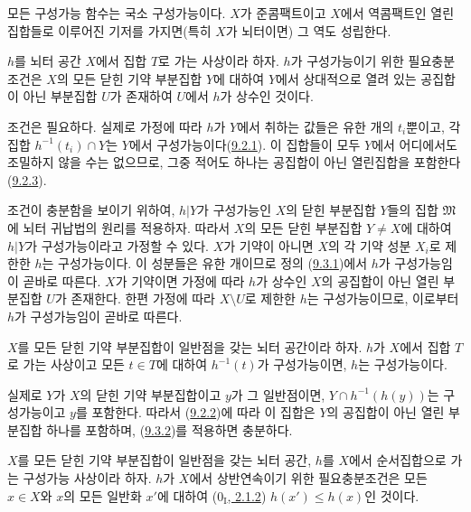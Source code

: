 모든 구성가능 함수는 국소 구성가능이다. $X$가 준콤팩트이고 $X$에서
역콤팩트인 열린집합들로 이루어진 기저를 가지면(특히 $X$가 뇌터이면)
그 역도 성립한다.

\begin{proposition}[9.3.2]
\label{0.9.3.2-ko}
$h$를 뇌터 공간 $X$에서 집합 $T$로 가는 사상이라 하자. $h$가
구성가능이기 위한 필요충분조건은 $X$의 모든 닫힌 기약 부분집합 $Y$에
대하여 $Y$에서 상대적으로 열려 있는 공집합이 아닌 부분집합 $U$가
존재하여 $U$에서 $h$가 상수인 것이다.
\end{proposition}

조건은 필요하다. 실제로 가정에 따라 $h$가 $Y$에서 취하는 값들은
유한 개의 $t_i$뿐이고, 각 집합 $h^{-1}(t_i)\cap Y$는 $Y$에서
구성가능이다(\hyperref[0.9.2.1-ko]{9.2.1}). 이 집합들이 모두 $Y$에서
어디에서도 조밀하지 않을 수는 없으므로, 그중 적어도 하나는 공집합이
아닌 열린집합을 포함한다
(\hyperref[0.9.2.3-ko]{9.2.3}).

조건이 충분함을 보이기 위하여, $h|Y$가 구성가능인 $X$의 닫힌 부분집합
$Y$들의 집합 $\mathfrak{M}$에 뇌터 귀납법의 원리를 적용하자. 따라서
$X$의 모든 닫힌 부분집합 $Y\ne X$에 대하여 $h|Y$가 구성가능이라고
가정할 수 있다. $X$가 기약이 아니면 $X$의 각 기약 성분 $X_i$로 제한한
$h$는 구성가능이다. 이 성분들은 유한 개이므로 정의
(\hyperref[0.9.3.1-ko]{9.3.1})에서 $h$가 구성가능임이 곧바로 따른다.
$X$가 기약이면 가정에 따라 $h$가 상수인 $X$의 공집합이 아닌 열린
부분집합 $U$가 존재한다. 한편 가정에 따라 $X\setminus U$로 제한한
$h$는 구성가능이므로, 이로부터 $h$가 구성가능임이 곧바로 따른다.

\begin{corollary}[9.3.3]
\label{0.9.3.3-ko}
$X$를 모든 닫힌 기약 부분집합이 일반점을 갖는 뇌터 공간이라 하자.
$h$가 $X$에서 집합 $T$로 가는 사상이고 모든 $t\in T$에 대하여
$h^{-1}(t)$가 구성가능이면, $h$는 구성가능이다.
\end{corollary}

실제로 $Y$가 $X$의 닫힌 기약 부분집합이고 $y$가 그 일반점이면,
$Y\cap h^{-1}(h(y))$는 구성가능이고 $y$를 포함한다. 따라서
(\hyperref[0.9.2.2-ko]{9.2.2})에 따라 이 집합은 $Y$의 공집합이 아닌
열린 부분집합 하나를 포함하며,
(\hyperref[0.9.3.2-ko]{9.3.2})를 적용하면 충분하다.

\begin{proposition}[9.3.4]
\label{0.9.3.4-ko}
$X$를 모든 닫힌 기약 부분집합이 일반점을 갖는 뇌터 공간, $h$를
$X$에서 순서집합으로 가는 구성가능 사상이라 하자. $h$가 $X$에서
상반연속이기 위한 필요충분조건은 모든 $x\in X$와 $x$의 모든 일반화
$x'$에 대하여
(\hyperref[0.2.1.2-ko]{$0_{\mathrm I}$, 2.1.2})
$h(x')\leq h(x)$인 것이다.
\end{proposition}

